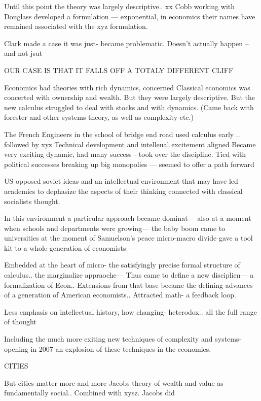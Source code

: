 Until this point the theory was largely descriptive..
xx Cobb working with Douglass developed a formulation — exponential, in economics their names have remained associated with the xyz formulation. 

Clark made a case it was just- became problematic.
Doesn't actually happen -- and not jsut

OUR CASE IS THAT IT FALLS OFF A TOTALY DIFFERENT CLIFF



Economics had theories with rich dynamics, concerned 
Classical economics was concerted with ownership and wealth. But they were largely descriptive.
But the new calculus struggled to deal with stocks and with dynamics. 
(Came back with forester and other systems theory, as well as complexity etc.)

The French Engineers in the school of bridge end road used calculus early .. followed by xyz
Technical development and intelleual excitement aligned
Became very exciting dynamic, had many success - took over the discipline. 
Tied with political successes breaking up big monopolies — seemed to offer a path forward

US opposed soviet ideas and an intellectual environment that may have led academics to dephasize the aspects of their thinking connected with classical socialists thought. 

In this environment a particular approach became dominat— also at a moment when schools and departments were growing— the baby boom came to universities at the moment of Samuelson’s peace micro-macro divide gave a tool kit to a whole generation of economists— 

Embedded at the heart of micro- the satisfyingly precise formal structure of calculus.. the marginalize appraoche— 
Thus came to define a new disciplien— a formalization of Econ.. 
Extensions from that base became the defining advances of a generation of American economists..
Attracted math- a feedback loop.

Less emphasis on intellectual history, how changing- heterodox.. all the full range of thought

Including the much more exiting new techniques of complexity and systems- opening in 2007 an explosion of these techniques in the economies. 




CITIES

But cities matter more and more
Jacobs theory of wealth and value as fundamentally social.. 
Combined with xysz. Jacobs did

